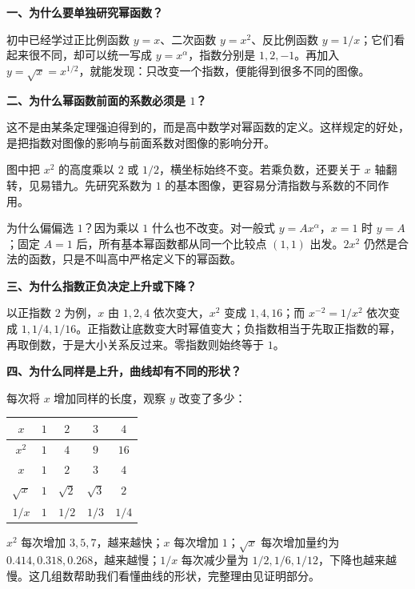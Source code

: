 \clearpage
\begin{explanationbox}
  \textbf{\textcolor{CExplanation}{一、为什么要单独研究幂函数？}}



  初中已经学过正比例函数 $y=x$、二次函数 $y=x^2$、反比例函数 $y=1/x$；它们看起来很不同，却可以统一写成 $y=x^\alpha$，指数分别是 $1,2,-1$。再加入 $y=\sqrt{x}=x^{1/2}$，就能发现：只改变一个指数，便能得到很多不同的图像。

  \medskip
  
\end{explanationbox}
\clearpage
\begin{explanationbox}
\textbf{\textcolor{CExplanation}{二、为什么幂函数前面的系数必须是 $1$？}}



  这不是由某条定理强迫得到的，而是高中数学对幂函数的定义。这样规定的好处，是把指数对图像的影响与前面系数对图像的影响分开。

  图中把 $x^2$ 的高度乘以 $2$ 或 $1/2$，横坐标始终不变。若乘负数，还要关于 $x$ 轴翻转，见易错九。先研究系数为 $1$ 的基本图像，更容易分清指数与系数的不同作用。

  为什么偏偏选 $1$？因为乘以 $1$ 什么也不改变。对一般式 $y=Ax^\alpha$，$x=1$ 时 $y=A$；固定 $A=1$ 后，所有基本幂函数都从同一个比较点 $(1,1)$ 出发。$2x^2$ 仍然是合法的函数，只是不叫高中严格定义下的幂函数。

\end{explanationbox}
\clearpage
\begin{explanationbox}
\textbf{\textcolor{CExplanation}{三、为什么指数正负决定上升或下降？}}



  以正指数 $2$ 为例，$x$ 由 $1,2,4$ 依次变大，$x^2$ 变成 $1,4,16$；而 $x^{-2}=1/x^2$ 依次变成 $1,1/4,1/16$。正指数让底数变大时幂值变大；负指数相当于先取正指数的幂，再取倒数，于是大小关系反过来。零指数则始终等于 $1$。

  \medskip
  
\end{explanationbox}
\clearpage
\begin{explanationbox}
\textbf{\textcolor{CExplanation}{四、为什么同样是上升，曲线却有不同的形状？}}



  每次将 $x$ 增加同样的长度，观察 $y$ 改变了多少：
  \begin{center}
  \renewcommand{\arraystretch}{1.25}
  \begin{tabular}{c|cccc}
    $x$ & $1$ & $2$ & $3$ & $4$\\ \hline
    $x^2$ & $1$ & $4$ & $9$ & $16$\\
    $x$ & $1$ & $2$ & $3$ & $4$\\
    $\sqrt{x}$ & $1$ & $\sqrt2$ & $\sqrt3$ & $2$\\
    $1/x$ & $1$ & $1/2$ & $1/3$ & $1/4$
  \end{tabular}
  \end{center}
  $x^2$ 每次增加 $3,5,7$，越来越快；$x$ 每次增加 $1$；$\sqrt{x}$ 每次增加量约为 $0.414,0.318,0.268$，越来越慢；$1/x$ 每次减少量为 $1/2,1/6,1/12$，下降也越来越慢。这几组数帮助我们看懂曲线的形状，完整理由见证明部分。

  \medskip
  
\end{explanationbox}
